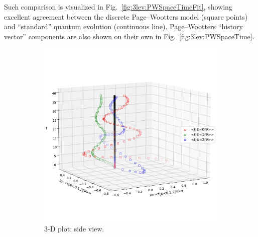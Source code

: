 Such comparison is visualized in Fig.~\ref{fig:3lev:PWSpaceTimeFit},
showing excellent agreement between the discrete Page--Wootters model (square points)
and ``standard'' quantum evolution (continuous line).
Page--Wootters ``history vector'' components are also shown on their own
in Fig.~\ref{fig:3lev:PWSpaceTime}.

\begin{figure}[]
  \begin{subfigure}[b]{\textwidth}
    \centering
    \includegraphics[height=0.41\textheight,clip,trim=0 90 0 140]{img/3ldetect/PWSpaceTime_side.pdf}
    \caption{3-D plot: side view.}
  \end{subfigure}
  \par\bigskip
  \begin{subfigure}[b]{\textwidth}
    \centering

\end{subfigure}
\end{figure}

